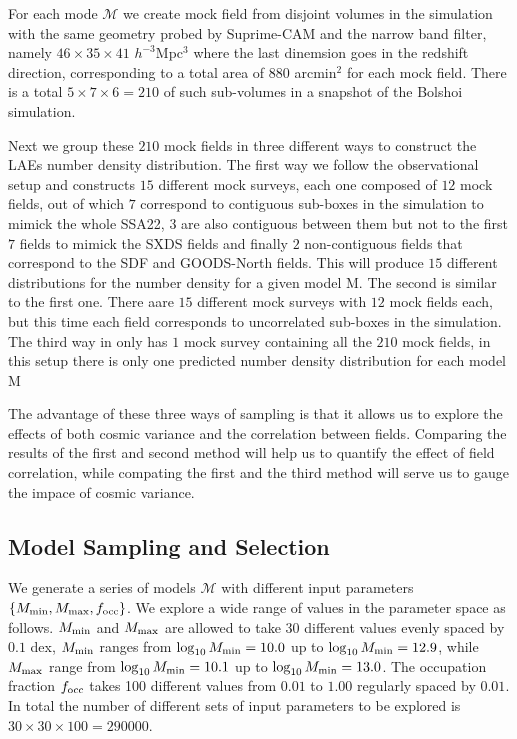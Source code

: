 \documentclass{emulateapj}
\begin{document}
For each mode ${\mathcal M}$ we create mock field from disjoint volumes in the simulation with the same geometry probed by Suprime-CAM and the narrow band filter, namely $46\times 35\times 41$ $h^{-3}$Mpc$^{3}$ where the last dinemsion goes in the redshift direction, corresponding to a total area of $880$ arcmin$^{2}$ for each mock field. There is a total $5\times 7 \times 6=210$ of such sub-volumes in a snapshot of the Bolshoi simulation. 

Next we group these $210$ mock fields in three different ways to construct the LAEs number density distribution. The first way we follow the observational setup and constructs $15$ different mock surveys, each one composed of $12$ mock fields, out of which $7$ correspond to contiguous sub-boxes in the simulation to mimick the whole SSA22, $3$ are also contiguous between them but not to the first $7$ fields to mimick the SXDS fields and finally $2$ non-contiguous fields that correspond to the SDF and GOODS-North fields. This will produce $15$ different distributions for the number density for a given model ${\mathrm M}$. The second is similar to the first one. There aare $15$ different mock surveys with $12$ mock fields each, but this time each field corresponds to uncorrelated sub-boxes in the simulation. The third way in only has $1$ mock survey containing all the $210$ mock fields, in this setup there is only one predicted number density distribution for each model ${\mathrm M}$

The advantage of these three ways of sampling is that it allows us to explore the effects of both cosmic variance and the correlation between fields. Comparing the results of the first and second method will help us to quantify the effect of field correlation, while compating the first and the third method will serve us to gauge the impace of cosmic variance.


\subsection{Model Sampling and Selection}

We generate a series of models ${\mathcal M}$ with different input parameters$\{M_{\rm min}, M_{\rm max}, f_{\rm occ}\}$. We explore a wide range of values in the parameter space as follows. $M_{\rm min}$ and $M_{\rm max}$ are allowed to take 30 different values evenly spaced by $0.1$ dex, $M_{\rm min}$ ranges from $\log_{10}M_{\rm min}=10.0$ up to $\log_{10}M_{\rm min}=12.9$, while $M_{\rm max}$ range  from $\log_{10}M_{\rm min}=10.1$ up to $\log_{10}M_{\rm min}=13.0$. The occupation fraction $f_{\rm occ}$ takes 100 different values from $0.01$ to $1.00$ regularly spaced by $0.01$. In total the number of different sets of input parameters to be explored is $30 \times 30\times 100 = 290000$.
\end{document}
